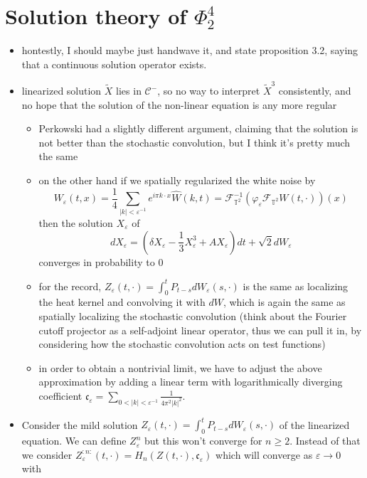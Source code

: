 \documentclass{report}
\theoremstyle{remark}
\theoremstyle{definition}
\let\epsilon\varepsilon
\begin{document}
\chapter{Solution theory of $\Phi^4_2$}
\begin{itemize}
  \item hontestly, I should maybe just handwave it, and state proposition 3.2, saying that a continuous solution operator exists.
  \item linearized solution $\tilde{X}$ lies in $\mathcal{C}^-$, so no way to interpret $\tilde{X}^3$ consistently, and no hope that the solution of the non-linear equation is any more regular
  \begin{itemize}
    \item Perkowski had a slightly different argument, claiming that the solution is not better than the stochastic convolution, but I think it's pretty much the same
    \item on the other hand if we spatially regularized the white noise by $$W_\epsilon(t, x) = \frac{1}{4}\sum_{\lvert k \rvert < \epsilon^{-1}} e^{i \pi k \cdot x}\hat{W}(k, t) = \mathcal{F}^{-1}_{\mathbb{T}^2}(\varphi_\epsilon \mathcal{F}_{\mathbb{T}^2}W(t, \cdot))(x)$$then the solution $X_\epsilon$ of $$dX_\epsilon = (\delta X_\epsilon - \frac{1}{3} X^3_\epsilon + A X_\epsilon) dt + \sqrt{2} dW_\epsilon$$converges in probability to $0$
    \item for the record, $Z_\epsilon(t, \cdot) = \int_0^t P_{t-s} dW_\epsilon(s, \cdot)$ is the same as localizing the heat kernel and convolving it with $dW$, which is again the same as spatially localizing the stochastic convolution (think about the Fourier cutoff projector as a self-adjoint linear operator, thus we can pull it in, by considering how the stochastic convolution acts on test functions)
    \item in order to obtain a nontrivial limit, we have to adjust the above approximation by adding a linear term with logarithmically diverging coefficient $\mathfrak{c}_\epsilon = \sum_{0 < |k| < \epsilon^{-1}}\frac{1}{4\pi^2 | k|^2}$.
  \end{itemize}
  \item Consider the mild solution $Z_\epsilon(t, \cdot) = \int_0^t P_{t-s} dW_\epsilon(s, \cdot)$ of the linearized equation. We can define $Z_\epsilon^n$ but this won't converge for $n \ge 2$. Instead of that we consider $Z^{:n:}_\epsilon(t, \cdot) = H_n(Z(t, \cdot), \mathfrak{c}_\epsilon)$ which will converge as $\epsilon \to 0$ with 
\end{itemize}
\end{document}
